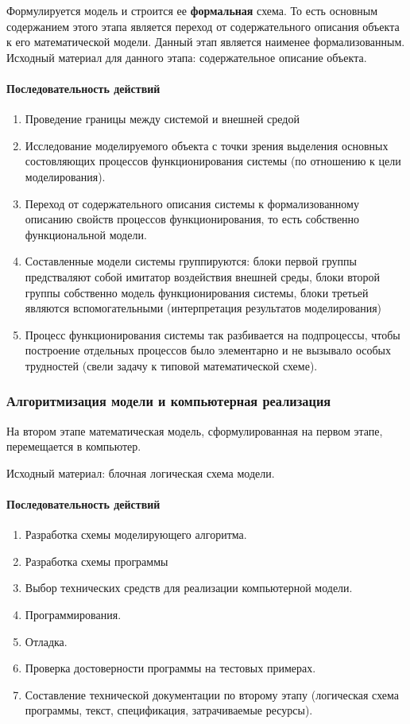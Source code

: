 Формулируется модель и строится ее \textbf{формальная} схема. То есть основным содержанием этого этапа является переход от содержательного описания объекта к его математической модели. Данный этап является наименее формализованным. Исходный материал для данного этапа: содержательное описание объекта.

\paragraph{Последовательность действий}

\begin{enumerate}
    \item Проведение границы между системой и внешней средой
    \item Исследование моделируемого объекта с точки зрения выделения основных состовляющих процессов функционирования системы (по отношению к цели моделирования).
    \item Переход от содержательного описания системы к формализованному описанию свойств процессов функционирования, то есть собственно функциональной модели.
    \item Составленные модели системы группируются: блоки первой группы предстваляют собой имитатор воздействия внешней среды, блоки второй группы собственно модель функционирования системы, блоки третьей являются вспомогательными (интерпретация результатов моделирования)
    \item Процесс функционирования системы так разбивается на подпроцессы, чтобы построение отдельных процессов было элементарно и не вызывало особых трудностей (свели задачу к типовой математической схеме).
\end{enumerate}

\subsubsection{Алгоритмизация модели и компьютерная реализация}

На втором этапе математическая модель, сформулированная на первом этапе, перемещается в компьютер.

Исходный материал: блочная логическая схема модели.

\paragraph{Последовательность действий}

\begin{enumerate}
    \item Разработка схемы моделирующего алгоритма.
    \item Разработка схемы программы
    \item Выбор технических средств для реализации компьютерной модели.
    \item Программирования.
    \item Отладка.
    \item Проверка достоверности программы на тестовых примерах.
    \item Составление технической документации по второму этапу (логическая схема программы, текст, спецификация, затрачиваемые ресурсы).
\end{enumerate}

